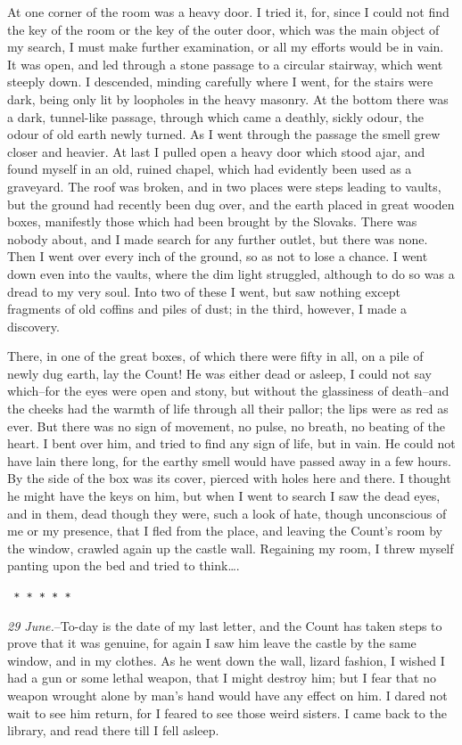 \documentclass[12pt,openright]{book}
\begin{document}
At one corner of the room was a heavy door. I tried it, for, since I could not find the key of the room or the key of the outer door, which was the main object of my search, I must make further examination, or all my efforts would be in vain. It was open, and led through a stone passage to a circular stairway, which went steeply down. I descended, minding carefully where I went, for the stairs were dark, being only lit by loopholes in the heavy masonry. At the bottom there was a dark, tunnel-like passage, through which came a deathly, sickly odour, the odour of old earth newly turned. As I went through the passage the smell grew closer and heavier. At last I pulled open a heavy door which stood ajar, and found myself in an old, ruined chapel, which had evidently been used as a graveyard. The roof was broken, and in two places were steps leading to vaults, but the ground had recently been dug over, and the earth placed in great wooden boxes, manifestly those which had been brought by the Slovaks. There was nobody about, and I made search for any further outlet, but there was none. Then I went over every inch of the ground, so as not to lose a chance. I went down even into the vaults, where the dim light struggled, although to do so was a dread to my very soul. Into two of these I went, but saw nothing except fragments of old coffins and piles of dust; in the third, however, I made a discovery.

There, in one of the great boxes, of which there were fifty in all, on a pile of newly dug earth, lay the Count! He was either dead or asleep, I could not say which–for the eyes were open and stony, but without the glassiness of death–and the cheeks had the warmth of life through all their pallor; the lips were as red as ever. But there was no sign of movement, no pulse, no breath, no beating of the heart. I bent over him, and tried to find any sign of life, but in vain. He could not have lain there long, for the earthy smell would have passed away in a few hours. By the side of the box was its cover, pierced with holes here and there. I thought he might have the keys on him, but when I went to search I saw the dead eyes, and in them, dead though they were, such a look of hate, though unconscious of me or my presence, that I fled from the place, and leaving the Count’s room by the window, crawled again up the castle wall. Regaining my room, I threw myself panting upon the bed and tried to think….

\texttt{   *       *       *       *       *}

\textit{29 June.}–To-day is the date of my last letter, and the Count has taken steps to prove that it was genuine, for again I saw him leave the castle by the same window, and in my clothes. As he went down the wall, lizard fashion, I wished I had a gun or some lethal weapon, that I might destroy him; but I fear that no weapon wrought alone by man’s hand would have any effect on him. I dared not wait to see him return, for I feared to see those weird sisters. I came back to the library, and read there till I fell asleep.
\end{document}

